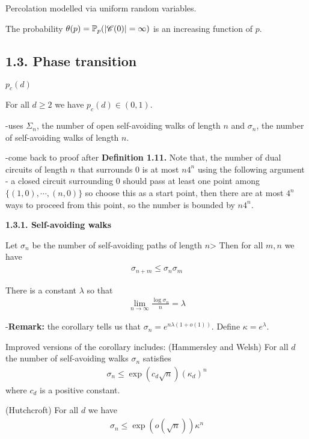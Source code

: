 \documentclass[10pt,a4paper]{report}
\begin{document}
 Percolation modelled via uniform random variables. 
\s

 The probability $\theta(p) = \mathbb{P}_p(|\mathscr{C}(0)|=\infty)$ is an increasing function of $p$.

\subsection*{1.3. Phase transition}

 $p_c(d)$
\s

 For all $d\geq 2$ we have $p_c(d) \in (0,1)$.

-uses $\Sigma_n$, the number of open self-avoiding walks of length $n$ and $\sigma_n$, the number of self-avoiding walks of length $n$.

-come back to proof after \textbf{Definition 1.11.} Note that, the number of dual circuits of length $n$ that surrounds 0 is at most $n4^n$ using the following argument - a closed circuit surrounding 0 should pass at least one point among $\{(1,0),\cdots,(n,0) \}$ so choose this as a start point, then there are at most $4^n$ ways to proceed from this point, so the number is bounded by $n4^n$.
\s

\textbf{1.3.1. Self-avoiding walks}
\s

 Let $\sigma_n$ be the number of self-avoiding paths of length $n$> Then for all $m,n$ we have
\begin{align*}
\sigma_{n+m} \leq \sigma_n \sigma_m
\end{align*}
\s

 There is a constant $\lambda$ so that
\begin{align*}
\lim_{n\rightarrow \infty} \frac{\log \sigma_n}{n} = \lambda
\end{align*}
\s

-\textbf{Remark:} the corollary tells us that $\sigma_n = e^{n\lambda (1+ o(1))}$. Define $\kappa = e^{\lambda}$.
\s

Improved versions of the corollary includes:
(Hammersley and Welsh) For all $d$ the number of self-avoiding walks $\sigma_n$ satisfies
\begin{align*}
\sigma_n \leq \exp(c_d \sqrt{n}) (\kappa_d)^n
\end{align*}
where $c_d$ is a positive constant.
\s

(Hutchcroft) For all $d$ we have
\begin{align*}
\sigma_n \leq \exp(o(\sqrt{n})) \kappa^n
\end{align*}
\end{document}
